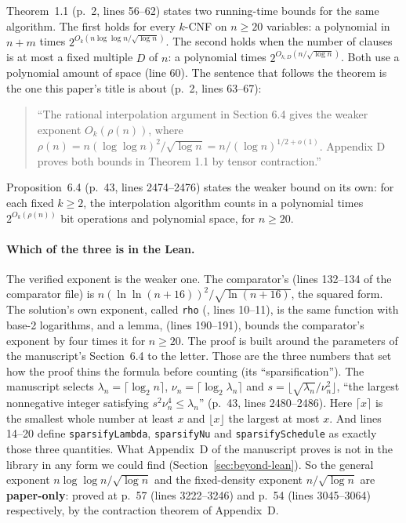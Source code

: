 Theorem~1.1 (p.~2, lines 56--62) states two running-time bounds for the
same algorithm. The first holds for every $k$-CNF on $n \ge 20$
variables: a polynomial in $n + m$ times
$2^{O_k(n\log\log n/\sqrt{\log n})}$. The second holds when the number of
clauses is at most a fixed multiple $D$ of $n$: a polynomial times
$2^{O_{k,D}(n/\sqrt{\log n})}$. Both use a polynomial amount of space
(line 60). The sentence that follows the theorem is the one this paper's
title is about (p.~2, lines 63--67):
\begin{quote}\small
``The rational interpolation argument in Section 6.4 gives the weaker
exponent $O_k(\rho(n))$, where
$\rho(n) = n(\log\log n)^2/\sqrt{\log n} = n/(\log n)^{1/2+o(1)}$.
Appendix D proves both bounds in Theorem 1.1 by tensor contraction.''
\end{quote}
Proposition~6.4 (p.~43, lines 2474--2476) states the weaker bound on its
own: for each fixed $k \ge 2$, the interpolation algorithm counts in a
polynomial times $2^{O_k(\rho(n))}$ bit operations and polynomial space,
for $n \ge 20$.

\paragraph{Which of the three is in the Lean.}
The verified exponent is the weaker one. The comparator's
\runtimeScale{} (lines 132--134 of the comparator file) is
$n(\ln\ln(n+16))^2/\sqrt{\ln(n+16)}$, the squared form. The solution's
own exponent, called \texttt{rho}
(, lines 10--11), is the same
function with base-2 logarithms, and a lemma,
 (lines 190--191), bounds the
comparator's exponent by four times it for $n \ge 20$. The proof is built around the parameters of the manuscript's
Section~6.4 to the letter. Those are the three numbers that set how the
proof thins the formula before counting (its ``sparsification''). The
manuscript selects $\lambda_n = \lceil\log_2 n\rceil$,
$\nu_n = \lceil\log_2\lambda_n\rceil$ and
$s = \lfloor\sqrt{\lambda_n}/\nu_n^2\rfloor$, ``the largest nonnegative
integer satisfying $s^2\nu_n^4 \le \lambda_n$'' (p.~43, lines
2480--2486). Here $\lceil x\rceil$ is the smallest whole number at least
$x$ and $\lfloor x\rfloor$ the largest at most $x$. And
 lines 14--20 define \texttt{sparsifyLambda},
\texttt{sparsifyNu} and \texttt{sparsifySchedule} as exactly those three
quantities. What
Appendix~D of the manuscript proves is not in the library in any form we
could find (Section~\ref{sec:beyond-lean}). So the general exponent
$n\log\log n/\sqrt{\log n}$ and the fixed-density exponent
$n/\sqrt{\log n}$ are \textbf{paper-only}: proved at p.~57 (lines
3222--3246) and p.~54 (lines 3045--3064) respectively, by the
contraction theorem of Appendix~D.

